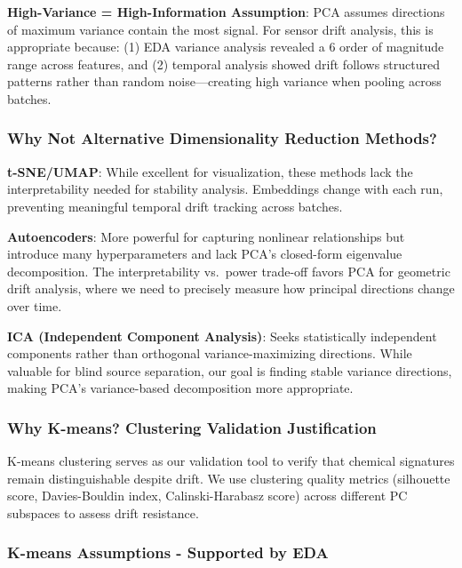 \documentclass[
  letterpaper,
  DIV=11,
  numbers=noendperiod]{scrartcl}
\begin{document}
\textbf{High-Variance = High-Information Assumption}: PCA assumes
directions of maximum variance contain the most signal. For sensor drift
analysis, this is appropriate because: (1) EDA variance analysis
revealed a 6 order of magnitude range across features, and (2) temporal
analysis showed drift follows structured patterns rather than random
noise---creating high variance when pooling across batches.

\subsubsection{Why Not Alternative Dimensionality Reduction
Methods?}\label{why-not-alternative-dimensionality-reduction-methods}

\textbf{t-SNE/UMAP}: While excellent for visualization, these methods
lack the interpretability needed for stability analysis. Embeddings
change with each run, preventing meaningful temporal drift tracking
across batches.

\textbf{Autoencoders}: More powerful for capturing nonlinear
relationships but introduce many hyperparameters and lack PCA's
closed-form eigenvalue decomposition. The interpretability vs.~power
trade-off favors PCA for geometric drift analysis, where we need to
precisely measure how principal directions change over time.

\textbf{ICA (Independent Component Analysis)}: Seeks statistically
independent components rather than orthogonal variance-maximizing
directions. While valuable for blind source separation, our goal is
finding stable variance directions, making PCA's variance-based
decomposition more appropriate.

\subsubsection{Why K-means? Clustering Validation
Justification}\label{why-k-means-clustering-validation-justification}

K-means clustering serves as our validation tool to verify that chemical
signatures remain distinguishable despite drift. We use clustering
quality metrics (silhouette score, Davies-Bouldin index,
Calinski-Harabasz score) across different PC subspaces to assess drift
resistance.

\subsubsection{K-means Assumptions - Supported by
EDA}\label{k-means-assumptions---supported-by-eda}
\end{document}
